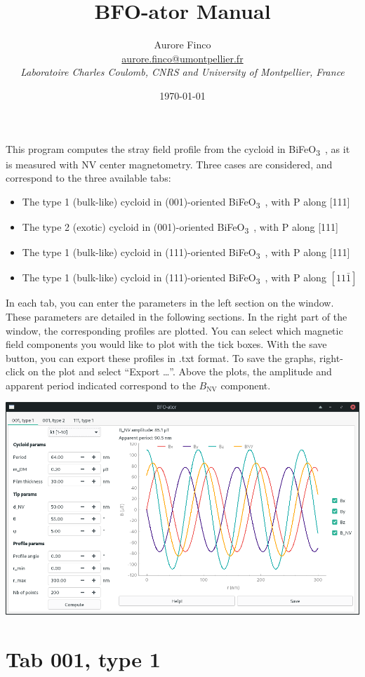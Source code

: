 \documentclass[a4paper,12pt]{article}
\title{BFO-ator Manual}
\author{Aurore Finco\\ \href{mailto:aurore.finco@umontpellier.fr}{aurore.finco@umontpellier.fr}\\ \textit{Laboratoire Charles Coulomb, CNRS and University of Montpellier, France}}
\date{\today}
\newcommand{\BFO}{BiFeO\textsubscript{3}\ }
\begin{document}
\maketitle

This program computes the stray field profile from the cycloid in \BFO, as it is measured with NV center magnetometry. Three cases are considered, and correspond to the three available tabs:
\begin{itemize}
  
\item The type 1 (bulk-like) cycloid in (001)-oriented \BFO, with P along [111]
\item The type 2 (exotic) cycloid in (001)-oriented \BFO, with P along [111]
\item The type 1 (bulk-like) cycloid in (111)-oriented \BFO, with P along [111]
\item The type 1 (bulk-like) cycloid in (111)-oriented \BFO, with P along $[11\bar{1}]$
\end{itemize}
In each tab, you can enter the parameters in the left section on the window. These parameters are detailed in the following sections. In the right part of the window, the corresponding profiles are plotted. You can select which magnetic field components you would like to plot with the tick boxes. With the save button, you can export these profiles in .txt format. To save the graphs, right-click on the plot and select ``Export \ldots''. Above the plots, the amplitude and apparent period indicated correspond to the $B_\text{NV}$ component.
\begin{center}
  \includegraphics[width=15cm]{BFO-ator_window.png}
\end{center}

\clearpage
\section{Tab 001, type 1}
\end{document}
